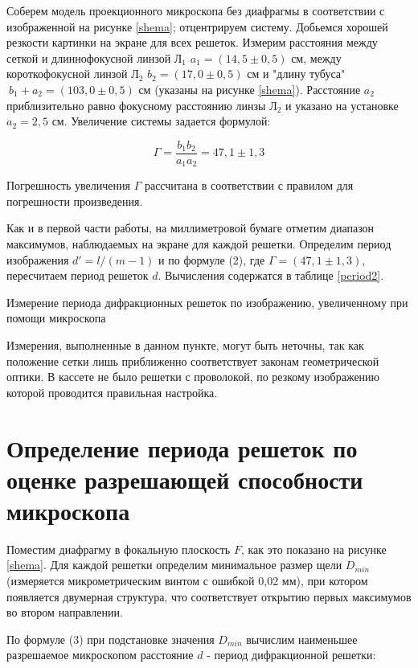 \documentclass[12pt]{kiarticle} %
\begin{document}
	Соберем модель проекционного микроскопа без диафрагмы в соответствии с изображенной на рисунке \ref{shema}; отцентрируем систему. Добьемся хорошей резкости картинки на экране для всех решеток. Измерим расстояния между сеткой и длиннофокусной линзой $\text{Л}_1$ $a_1 = (14,5 \pm 0,5)$ см, между короткофокусной линзой $\text{Л}_2$ $b_2 = (17,0 \pm 0,5)$ см и "длину тубуса" $\ b_1 + a_2 = (103,0 \pm 0,5)$ см (указаны на рисунке \ref{shema}). Расстояние $a_2$ приблизительно равно фокусному расстоянию линзы $\text{Л}_2$ и указано на установке $a_2 = 2,5$ см. Увеличение системы задается формулой: 
	
	\[ \Gamma = \frac{b_1b_2}{a_1a_2} = 47,1 \pm 1,3 \]
	
	Погрешность увеличения $\Gamma$ рассчитана в соответствии с правилом для погрешности произведения. 
	
	Как и в первой части работы, на миллиметровой бумаге отметим диапазон максимумов, наблюдаемых на экране для каждой решетки. Определим период изображения $d' = l/(m-1)$ и по формуле (2), где $\Gamma = (47,1 \pm 1,3)$, пересчитаем период решеток $d$. Вычисления содержатся в таблице \ref{period2}.
	
	\begin{table}[h]
		\centering
		
		\caption{Измерение периода дифракционных решеток по изображению, увеличенному при помощи микроскопа}
		\label{period2}
	\end{table}	
	
	Измерения, выполненные в данном пункте, могут быть неточны, так как положение сетки лишь приближенно соответствует законам геометрической оптики. В кассете не было решетки с проволокой, по резкому изображению которой проводится правильная настройка. 
	
	\clearpage
	
	\section{Определение периода решеток по оценке разрешающей способности микроскопа}
	
	Поместим диафрагму в фокальную плоскость $F$, как это показано на рисунке \ref{shema}. Для каждой решетки определим минимальное размер щели $D_{min}$ (измеряется микрометрическим винтом с ошибкой 0,02 мм), при котором появляется двумерная структура, что соответствует открытию первых максимумов во втором направлении. 
	
	По формуле (3) при подстановке значения $D_{min}$ вычислим наименьшее разрешаемое микроскопом расстояние $d$ - период дифракционной решетки: 
	
\end{document}
